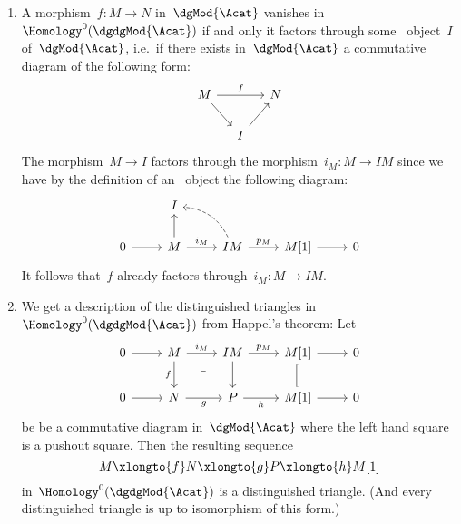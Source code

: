 \documentclass[a4paper,10pt]{scrartcl}
\begin{document}
\begin{enumerate}
  \item
    A morphism~$f \colon M \to N$ in~$\dgMod{\Acat}$ vanishes in~$\Homology^0(\dgdgMod{\Acat})$ if and only it factors through some~{\injective{$\Sfrob_{\Acat}$}} object~$I$ of~$\dgMod{\Acat}$, i.e.\ if there exists in~$\dgMod{\Acat}$ a commutative diagram of the following form:
    \[
      \begin{tikzcd}[column sep = small]
        M
        \arrow{rr}[above]{f}
        \arrow{dr}
        &
        {}
        &
        N
        \\
        {}
        &
        I
        \arrow{ur}
        &
        {}
      \end{tikzcd}
    \]
    The morphism~$M \to I$ factors through the morphism~$i_M \colon M \to IM$ since we have by the definition of an~{\injective{$\Sfrob_{\Acat}$}} object the following diagram:
    \[
      \begin{tikzcd}
        {}
        &
        I
        &
        {}
        &
        {}
        &
        {}
        \\
        0
        \arrow{r}
        &
        M
        \arrow{u}
        \arrow{r}[above]{i_M}
        &
        IM
        \arrow[dashed, bend right]{ul}
        \arrow{r}[above]{p_M}
        &
        M[1]
        \arrow{r}
        &
        0
      \end{tikzcd}
    \]
    It follows that~$f$ already factors through~$i_M \colon M \to IM$.
  \item
    We get a description of the distinguished triangles in~$\Homology^0(\dgdgMod{\Acat})$ from Happel’s theorem:
    Let
    \[
      \begin{tikzcd}
        0
        \arrow{r}
        &
        M
        \arrow{r}[above]{i_M}
        \arrow{d}[left]{f}
        \arrow[phantom]{dr}{\ulcorner}
        &
        IM
        \arrow{r}[above]{p_M}
        \arrow{d}
        &
        M[1]
        \arrow{r}
        \arrow[equal]{d}
        &
        0
        \\
        0
        \arrow{r}
        &
        N
        \arrow{r}[below]{g}
        &
        P
        \arrow{r}[below]{h}
        &
        M[1]
        \arrow{r}
        &
        0
      \end{tikzcd}
    \]
    be be a commutative diagram in~$\dgMod{\Acat}$ where the left hand square is a pushout square.
    Then the resulting sequence
    \[
      M
      \xlongto{f}
      N
      \xlongto{g}
      P
      \xlongto{h}
      M[1]
    \]
    in~$\Homology^0(\dgdgMod{\Acat})$ is a distinguished triangle.
    (And every distinguished triangle is up to isomorphism of this form.)
\end{enumerate}
\end{document}

